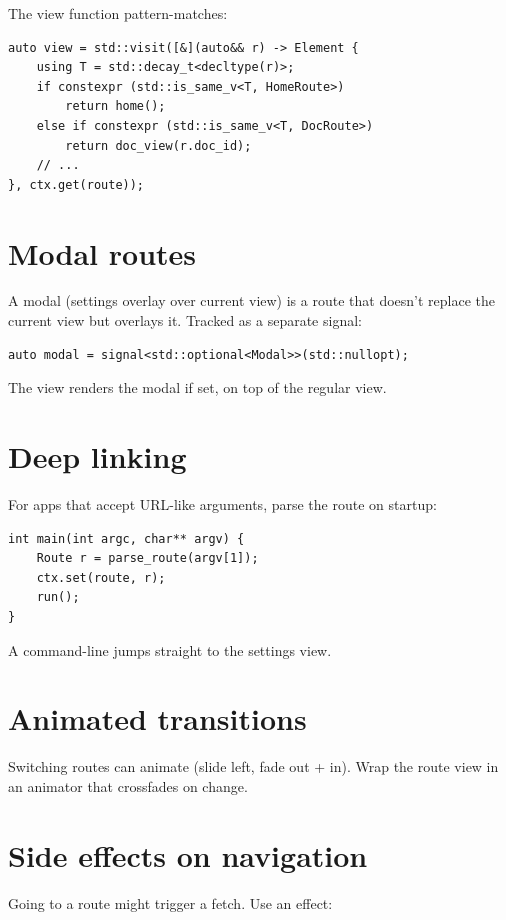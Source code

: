 The view function pattern-matches:

\begin{lstlisting}
auto view = std::visit([&](auto&& r) -> Element {
    using T = std::decay_t<decltype(r)>;
    if constexpr (std::is_same_v<T, HomeRoute>)
        return home();
    else if constexpr (std::is_same_v<T, DocRoute>)
        return doc_view(r.doc_id);
    // ...
}, ctx.get(route));
\end{lstlisting}

\section{Modal routes}

A modal (settings overlay over current view) is a route
that doesn't replace the current view but overlays it.
Tracked as a separate signal:

\begin{lstlisting}
auto modal = signal<std::optional<Modal>>(std::nullopt);
\end{lstlisting}

The view renders the modal if set, on top of the regular
view.

\section{Deep linking}

For apps that accept URL-like arguments, parse the route on
startup:

\begin{lstlisting}
int main(int argc, char** argv) {
    Route r = parse_route(argv[1]);
    ctx.set(route, r);
    run();
}
\end{lstlisting}

A  command-line jumps straight to the
settings view.

\section{Animated transitions}

Switching routes can animate (slide left, fade out + in).
Wrap the route view in an animator that crossfades on
change.

\section{Side effects on navigation}

Going to a route might trigger a fetch. Use an effect:

